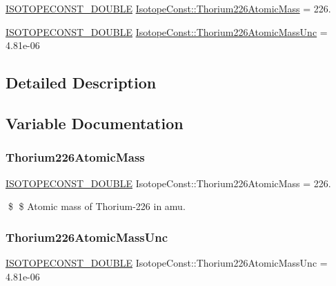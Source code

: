 \begin{DoxyCompactItemize}
\item 
\mbox{\hyperlink{group___isotope_const-_macros_ga8f45a7272ce02c0b4c65c44636ed719a}{I\+S\+O\+T\+O\+P\+E\+C\+O\+N\+S\+T\+\_\+\+D\+O\+U\+B\+LE}} \mbox{\hyperlink{group___isotope_const-_thorium-_th226_ga9abdf0cd46b9ba291e8bfbb47fd9d6bd}{Isotope\+Const\+::\+Thorium226\+Atomic\+Mass}} = 226.
\item 
\mbox{\hyperlink{group___isotope_const-_macros_ga8f45a7272ce02c0b4c65c44636ed719a}{I\+S\+O\+T\+O\+P\+E\+C\+O\+N\+S\+T\+\_\+\+D\+O\+U\+B\+LE}} \mbox{\hyperlink{group___isotope_const-_thorium-_th226_gaffdbbfc4049b2a7b93ab2c1b6f8f4319}{Isotope\+Const\+::\+Thorium226\+Atomic\+Mass\+Unc}} = 4.\+81e-\/06
\end{DoxyCompactItemize}


\subsection{Detailed Description}


\subsection{Variable Documentation}
\mbox{\label{group___isotope_const-_thorium-_th226_ga9abdf0cd46b9ba291e8bfbb47fd9d6bd}} 
\subsubsection{\texorpdfstring{Thorium226\+Atomic\+Mass}{Thorium226AtomicMass}}
{\footnotesize\ttfamily \mbox{\hyperlink{group___isotope_const-_macros_ga8f45a7272ce02c0b4c65c44636ed719a}{I\+S\+O\+T\+O\+P\+E\+C\+O\+N\+S\+T\+\_\+\+D\+O\+U\+B\+LE}} Isotope\+Const\+::\+Thorium226\+Atomic\+Mass = 226.}

\$ \$ Atomic mass of Thorium-\/226 in amu. \mbox{\label{group___isotope_const-_thorium-_th226_gaffdbbfc4049b2a7b93ab2c1b6f8f4319}} 
\subsubsection{\texorpdfstring{Thorium226\+Atomic\+Mass\+Unc}{Thorium226AtomicMassUnc}}
{\footnotesize\ttfamily \mbox{\hyperlink{group___isotope_const-_macros_ga8f45a7272ce02c0b4c65c44636ed719a}{I\+S\+O\+T\+O\+P\+E\+C\+O\+N\+S\+T\+\_\+\+D\+O\+U\+B\+LE}} Isotope\+Const\+::\+Thorium226\+Atomic\+Mass\+Unc = 4.\+81e-\/06}

